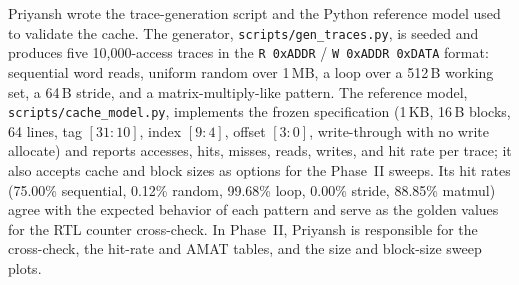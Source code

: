 Priyansh wrote the trace-generation script and the Python reference model used to validate the cache. The generator, \texttt{scripts/gen\_traces.py}, is seeded and produces five 10{,}000-access traces in the \texttt{R~0xADDR} / \texttt{W~0xADDR~0xDATA} format: sequential word reads, uniform random over 1\,MB, a loop over a 512\,B working set, a 64\,B stride, and a matrix-multiply-like pattern. The reference model, \texttt{scripts/cache\_model.py}, implements the frozen specification (1\,KB, 16\,B blocks, 64 lines, tag $[31:10]$, index $[9:4]$, offset $[3:0]$, write-through with no write allocate) and reports accesses, hits, misses, reads, writes, and hit rate per trace; it also accepts cache and block sizes as options for the Phase~II sweeps. Its hit rates (75.00\% sequential, 0.12\% random, 99.68\% loop, 0.00\% stride, 88.85\% matmul) agree with the expected behavior of each pattern and serve as the golden values for the RTL counter cross-check. In Phase~II, Priyansh is responsible for the cross-check, the hit-rate and AMAT tables, and the size and block-size sweep plots.
